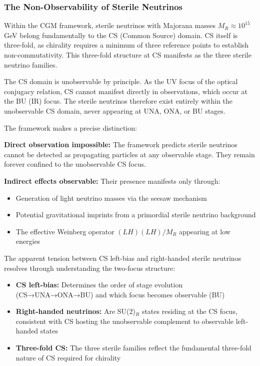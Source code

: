 \documentclass[11pt,a4paper]{article}
\theoremstyle{definition}
\theoremstyle{remark}
\begin{document}
\subsubsection{The Non-Observability of Sterile Neutrinos}

Within the CGM framework, sterile neutrinos with Majorana masses $M_R \approx 10^{15}$ GeV belong fundamentally to the CS (Common Source) domain. CS itself is three-fold, as chirality requires a minimum of three reference points to establish non-commutativity. This three-fold structure at CS manifests as the three sterile neutrino families.

The CS domain is unobservable by principle. As the UV focus of the optical conjugacy relation, CS cannot manifest directly in observations, which occur at the BU (IR) focus. The sterile neutrinos therefore exist entirely within the unobservable CS domain, never appearing at UNA, ONA, or BU stages.

The framework makes a precise distinction:

\textbf{Direct observation impossible:} The framework predicts sterile neutrinos cannot be detected as propagating particles at any observable stage. They remain forever confined to the unobservable CS focus.

\textbf{Indirect effects observable:} Their presence manifests only through:
\begin{itemize}
\item Generation of light neutrino masses via the seesaw mechanism
\item Potential gravitational imprints from a primordial sterile neutrino background
\item The effective Weinberg operator $(LH)(LH)/M_R$ appearing at low energies
\end{itemize}

The apparent tension between CS left-bias and right-handed sterile neutrinos resolves through understanding the two-focus structure:

\begin{itemize}
\item \textbf{CS left-bias:} Determines the order of stage evolution (CS→UNA→ONA→BU) and which focus becomes observable (BU)
\item \textbf{Right-handed neutrinos:} Are SU(2)$_R$ states residing at the CS focus, consistent with CS hosting the unobservable complement to observable left-handed states
\item \textbf{Three-fold CS:} The three sterile families reflect the fundamental three-fold nature of CS required for chirality
\end{itemize}
\end{document}
